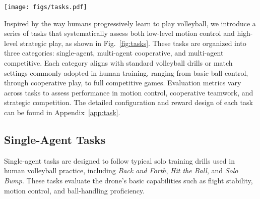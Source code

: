 \begin{figure*}[t]
    \centering
    \texttt{[image: figs/tasks.pdf]}
    \caption{Proposed tasks in the VolleyBots testbed, inspired by the process of human learning in volleyball. Single-agent tasks evaluate low-level control, while multi-agent cooperative and competitive tasks integrate high-level decision-making with low-level control.}
    \label{fig:tasks}
\end{figure*}

Inspired by the way humans progressively learn to play volleyball, we introduce a series of tasks that systematically assess both low-level motion control and high-level strategic play, as shown in Fig.~\ref{fig:tasks}.
These tasks are organized into three categories: single-agent, multi-agent cooperative, and multi-agent competitive. Each category aligns with standard volleyball drills or match settings commonly adopted in human training, ranging from basic ball control, through cooperative play, to full competitive games. Evaluation metrics vary across tasks to assess performance in motion control, cooperative teamwork, and strategic competition. The detailed configuration and reward design of each task can be found in Appendix~\ref{app:task}.

\subsection{Single-Agent Tasks}

Single-agent tasks are designed to follow typical solo training drills used in human volleyball practice, including \textit{Back and Forth}, \textit{Hit the Ball}, and \textit{Solo Bump}. These tasks evaluate the drone's basic capabilities such as flight stability, motion control, and ball-handling proficiency.

